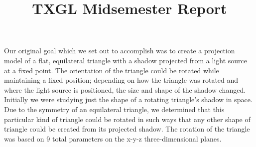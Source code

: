 \documentclass[11pt]{extarticle}
\title{TXGL Midsemester Report}
\begin{document}
    \maketitle

    Our original goal which we set out to accomplish was to create a projection model of a flat, equilateral triangle with a shadow projected from a light source at a fixed point. The orientation of the triangle could be rotated while maintaining a fixed position; depending on how the triangle was rotated and where the light source is positioned, the size and shape of the shadow changed. Initially we were studying just the shape of a rotating triangle’s shadow in space. Due to the symmetry of an equilateral triangle, we determined that this particular kind of triangle could be rotated in such ways that any other shape of triangle could be created from its projected shadow. The rotation of the triangle was based on 9 total parameters on the x-y-z three-dimensional planes.
\end{document}
